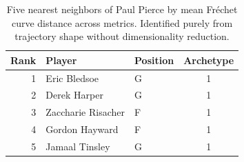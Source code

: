 \begin{table}[htbp]
  \centering\small
  \begin{tabular}{rllc}
    \toprule
    Rank & Player & Position & Archetype \\
    \midrule
    1 & Eric Bledsoe & G & 1 \\
    2 & Derek Harper & G & 1 \\
    3 & Zaccharie Risacher & F & 1 \\
    4 & Gordon Hayward & F & 1 \\
    5 & Jamaal Tinsley & G & 1 \\
    \bottomrule
  \end{tabular}
  \caption{Five nearest neighbors of Paul Pierce by mean Fr\'{e}chet curve distance across metrics. Identified purely from trajectory shape without dimensionality reduction.}
  \label{tab:Paul_Pierce_frechet_curve_neighbors}
\end{table}

